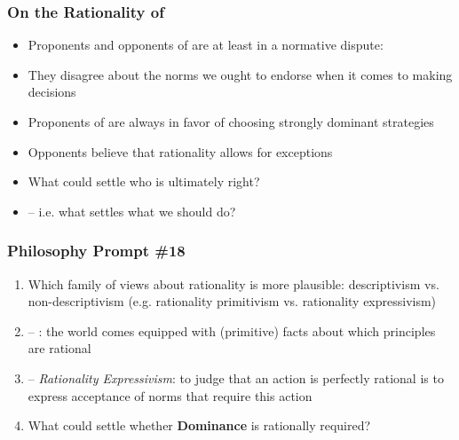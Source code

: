 \begin{frame}
\frametitle{On the Rationality of }

\begin{itemize}[<+->]

\item Proponents and opponents of  are at least in a normative dispute:

\item[] They disagree about the norms we ought to endorse when it comes to making decisions

\item Proponents of  are always in favor of choosing strongly dominant strategies

\item Opponents believe that rationality allows for exceptions 

\item What could settle who is ultimately right? 

\item[] -- i.e. what settles what we should do?


\end{itemize}
\end{frame}

\begin{frame}
\frametitle{Philosophy Prompt \#18}

\begin{enumerate}[<+->]

\item Which family of views about rationality is more plausible: descriptivism vs. non-descriptivism (e.g. rationality primitivism vs. rationality expressivism)

\item[] -- : the world comes equipped with (primitive) facts about which principles are rational

\item[] -- \emph{Rationality Expressivism}: to judge that an action is perfectly rational is to express acceptance of norms that require this action

\item What could settle whether \textbf{Dominance} is rationally required?

\end{enumerate}
\end{frame}

\iffalse %

